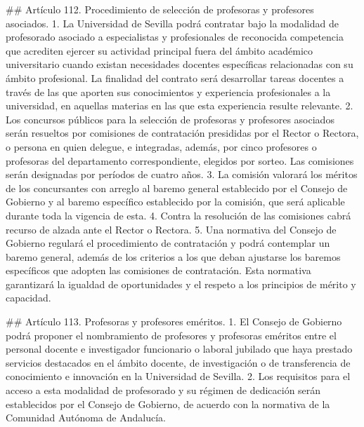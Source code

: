 \documentclass{article}
\begin{document}
\begin{itemize}
\begin{itemize}
\begin{scriptsize}
                  \#\# Artículo 112. Procedimiento de selección de profesoras y profesores asociados.
                  1. La Universidad de Sevilla podrá contratar bajo la modalidad de profesorado asociado a especialistas y profesionales de reconocida competencia que acrediten ejercer su actividad principal fuera del ámbito académico universitario cuando existan necesidades docentes específicas relacionadas con su ámbito profesional. La finalidad del contrato será desarrollar tareas docentes a través de las que aporten sus conocimientos y experiencia profesionales a la universidad, en aquellas materias en las que esta experiencia resulte relevante.
                  2. Los concursos públicos para la selección de profesoras y profesores asociados serán resueltos por comisiones de contratación presididas por el Rector o Rectora, o persona en quien delegue, e integradas, además, por cinco profesores o profesoras del departamento correspondiente, elegidos por sorteo. Las comisiones serán designadas por períodos de cuatro años.
                  3. La comisión valorará los méritos de los concursantes con arreglo al baremo general establecido por el Consejo de Gobierno y al baremo específico establecido por la comisión, que será aplicable durante toda la vigencia de esta.
                  4. Contra la resolución de las comisiones cabrá recurso de alzada ante el Rector o Rectora.
                  5. Una normativa del Consejo de Gobierno regulará el procedimiento de contratación y podrá contemplar un baremo general, además de los criterios a los que deban ajustarse los baremos específicos que adopten las comisiones de contratación. Esta normativa garantizará la igualdad de oportunidades y el respeto a los principios de mérito y capacidad.

                  \#\# Artículo 113. Profesoras y profesores eméritos.
                  1. El Consejo de Gobierno podrá proponer el nombramiento de profesores y profesoras eméritos entre el personal docente e investigador funcionario o laboral jubilado que haya prestado servicios destacados en el ámbito docente, de investigación o de transferencia de conocimiento e innovación en la Universidad de Sevilla.
                  2. Los requisitos para el acceso a esta modalidad de profesorado y su régimen de dedicación serán establecidos por el Consejo de Gobierno, de acuerdo con la normativa de la Comunidad Autónoma de Andalucía.


\end{scriptsize}
\end{itemize}
\end{itemize}
\end{document}
